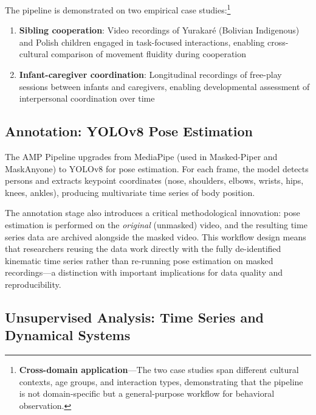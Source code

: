 \documentclass[../main.tex]{subfiles}
\begin{document}
The pipeline is demonstrated on two empirical case studies:\footnote{\textbf{Cross-domain application}---The two case studies span different cultural contexts, age groups, and interaction types, demonstrating that the pipeline is not domain-specific but a general-purpose workflow for behavioral observation.}

\begin{enumerate}
    \item \textbf{Sibling cooperation}: Video recordings of Yurakar\'{e} (Bolivian Indigenous) and Polish children engaged in task-focused interactions, enabling cross-cultural comparison of movement fluidity during cooperation
    \item \textbf{Infant-caregiver coordination}: Longitudinal recordings of free-play sessions between infants and caregivers, enabling developmental assessment of interpersonal coordination over time
\end{enumerate}

\subsection{Annotation: YOLOv8 Pose Estimation}

The AMP Pipeline upgrades from MediaPipe (used in Masked-Piper and MaskAnyone) to YOLOv8 for pose estimation. For each frame, the model detects persons and extracts keypoint coordinates (nose, shoulders, elbows, wrists, hips, knees, ankles), producing multivariate time series of body position.

The annotation stage also introduces a critical methodological innovation: pose estimation is performed on the \textit{original} (unmasked) video, and the resulting time series data are archived alongside the masked video. This workflow design means that researchers reusing the data work directly with the fully de-identified kinematic time series rather than re-running pose estimation on masked recordings---a distinction with important implications for data quality and reproducibility.

\subsection{Unsupervised Analysis: Time Series and Dynamical Systems}
\end{document}
